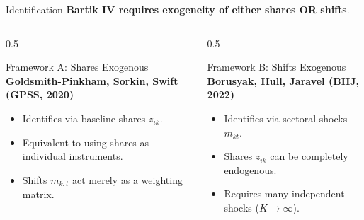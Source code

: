 \documentclass[
  11pt,
  ignorenonframetext,
  aspectratio=169,
]{beamer}
\providecommand{\tightlist}{%
  \setlength{\itemsep}{0pt}\setlength{\parskip}{0pt}}
\begin{document}
\begin{frame}{Identification}
\protect{}\label{identification}
\textbf{Bartik IV requires exogeneity of either shares OR shifts}.

\begin{columns}[T]
\begin{column}{0.5\linewidth}
\begin{block}{Framework A: Shares Exogenous}
\protect{}\label{framework-a-shares-exogenous}
\textbf{Goldsmith-Pinkham, Sorkin, Swift (GPSS, 2020)}

\begin{itemize}
\tightlist
\item
  Identifies via baseline shares \(z_{ik}\).
\item
  Equivalent to using shares as individual instruments.
\item
  Shifts \(m_{k,t}\) act merely as a weighting matrix.
\end{itemize}
\end{block}
\end{column}

\begin{column}{0.5\linewidth}
\begin{block}{Framework B: Shifts Exogenous}
\protect{}\label{framework-b-shifts-exogenous}
\textbf{Borusyak, Hull, Jaravel (BHJ, 2022)}

\begin{itemize}
\tightlist
\item
  Identifies via sectoral shocks \(m_{kt}\).
\item
  Shares \(z_{ik}\) can be completely endogenous.
\item
  Requires many independent shocks (\(K \to \infty\)).
\end{itemize}
\end{block}
\end{column}
\end{columns}
\end{frame}
\end{document}
